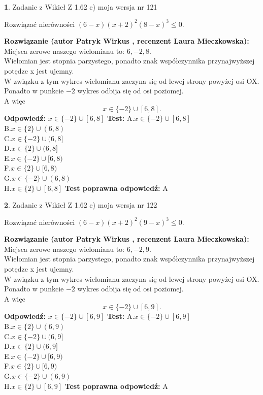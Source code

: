 \documentclass[12pt, a4paper]{article}
\theoremstyle{definition} %
\newtheorem{zad}{}
\newcommand{\zadStart}[1]{\begin{zad}#1\newline}
\newcommand{\zadStop}{\end{zad}}
\newcommand{\rozwStart}[2]{\noindent \textbf{Rozwiązanie (autor #1 , recenzent #2): }\newline}
\newcommand{\rozwStop}{\newline}
\newcommand{\odpStart}{\noindent \textbf{Odpowiedź:}\newline}
\newcommand{\odpStop}{\newline}
\newcommand{\testStart}{\noindent \textbf{Test:}\newline}
\newcommand{\testStop}{\newline}
\newcommand{\kluczStart}{\noindent \textbf{Test poprawna odpowiedź:}\newline}
\newcommand{\kluczStop}{\newline}
\begin{document}
\zadStart{Zadanie z Wikieł Z 1.62 c) moja wersja nr 121}

Rozwiązać nierówności $(6-x)(x+2)^{2}(8-x)^{3}\le0$.
\zadStop
\rozwStart{Patryk Wirkus}{Laura Mieczkowska}
Miejsca zerowe naszego wielomianu to: $6, -2, 8$.\\
Wielomian jest stopnia parzystego, ponadto znak współczynnika przy\linebreak najwyższej potędze x jest ujemny.\\ W związku z tym wykres wielomianu zaczyna się od lewej strony powyżej osi OX.\\
Ponadto w punkcie $-2$ wykres odbija się od osi poziomej.\\
A więc $$x \in \{-2\} \cup [6,8].$$
\rozwStop
\odpStart
$x \in \{-2\} \cup [6,8]$
\odpStop
\testStart
A.$x \in \{-2\} \cup [6,8]$\\
B.$x \in \{2\} \cup (6,8)$\\
C.$x \in \{-2\} \cup (6,8]$\\
D.$x \in \{2\} \cup (6,8]$\\
E.$x \in \{-2\} \cup [6,8)$\\
F.$x \in \{2\} \cup [6,8)$\\
G.$x \in \{-2\} \cup (6,8)$\\
H.$x \in \{2\} \cup [6,8]$
\testStop
\kluczStart
A
\kluczStop



\zadStart{Zadanie z Wikieł Z 1.62 c) moja wersja nr 122}

Rozwiązać nierówności $(6-x)(x+2)^{2}(9-x)^{3}\le0$.
\zadStop
\rozwStart{Patryk Wirkus}{Laura Mieczkowska}
Miejsca zerowe naszego wielomianu to: $6, -2, 9$.\\
Wielomian jest stopnia parzystego, ponadto znak współczynnika przy\linebreak najwyższej potędze x jest ujemny.\\ W związku z tym wykres wielomianu zaczyna się od lewej strony powyżej osi OX.\\
Ponadto w punkcie $-2$ wykres odbija się od osi poziomej.\\
A więc $$x \in \{-2\} \cup [6,9].$$
\rozwStop
\odpStart
$x \in \{-2\} \cup [6,9]$
\odpStop
\testStart
A.$x \in \{-2\} \cup [6,9]$\\
B.$x \in \{2\} \cup (6,9)$\\
C.$x \in \{-2\} \cup (6,9]$\\
D.$x \in \{2\} \cup (6,9]$\\
E.$x \in \{-2\} \cup [6,9)$\\
F.$x \in \{2\} \cup [6,9)$\\
G.$x \in \{-2\} \cup (6,9)$\\
H.$x \in \{2\} \cup [6,9]$
\testStop
\kluczStart
A
\kluczStop
\end{document}
